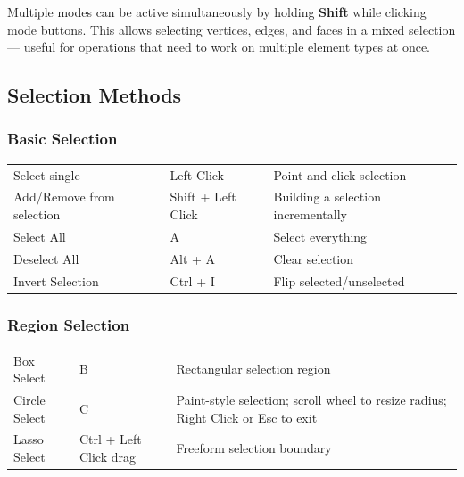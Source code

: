 Multiple modes can be active simultaneously by holding \textbf{Shift} while clicking mode buttons. This allows selecting vertices, edges, and faces in a mixed selection --- useful for operations that need to work on multiple element types at once.

\subsection{Selection Methods}
\label{sec:selectionmethods}

\subsubsection{Basic Selection}

\begin{shortcutbox}
\begin{center}
\begin{tabularx}{\textwidth}{L{4.5cm}C{3.5cm}X}
\toprule
{}
 &  &  \\
\midrule
Select single & Left Click & Point-and-click selection \\
Add/Remove from selection & Shift + Left Click & Building a selection incrementally \\
Select All & A & Select everything \\
Deselect All & Alt + A & Clear selection \\
Invert Selection & Ctrl + I & Flip selected/unselected \\
\bottomrule
\end{tabularx}
\end{center}
\end{shortcutbox}

\subsubsection{Region Selection}

\begin{shortcutbox}
\begin{center}
\begin{tabularx}{\textwidth}{L{4.5cm}C{3.5cm}X}
\toprule
{}
 &  &  \\
\midrule
Box Select & B & Rectangular selection region \\
Circle Select & C & Paint-style selection; scroll wheel to resize radius; Right Click or Esc to exit \\
Lasso Select & Ctrl + Left Click drag & Freeform selection boundary \\
\bottomrule
\end{tabularx}
\end{center}
\end{shortcutbox}

